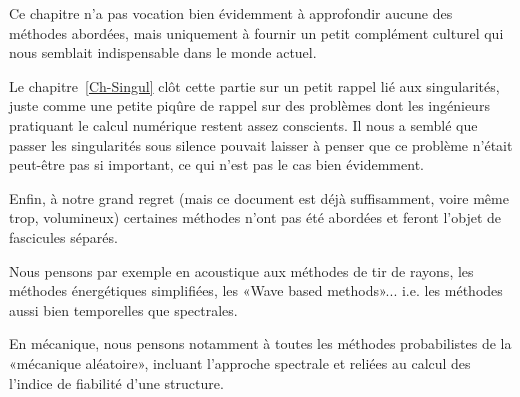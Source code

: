 Ce chapitre n'a pas vocation bien évidemment à approfondir aucune des méthodes
abordées, mais uniquement à fournir un petit complément culturel qui nous semblait
indispensable dans le monde actuel.

\medskip
Le chapitre~\ref{Ch-Singul} clôt cette partie sur un petit rappel lié aux singularités,
juste comme une petite piqûre de rappel sur des problèmes dont les ingénieurs pratiquant
le calcul numérique restent assez conscients. Il nous a semblé que passer les singularités
sous silence pouvait laisser à penser que ce problème n'était peut-être pas si
important, ce qui n'est pas le cas bien évidemment.


\medskip
Enfin, à notre grand regret (mais ce document est déjà suffisamment, voire même trop,
volumineux) certaines méthodes n'ont pas été abordées et feront l'objet de fascicules
séparés.

Nous pensons par exemple en acoustique aux méthodes de tir de rayons, les méthodes
énergétiques simplifiées, les «Wave based methods»... i.e. les méthodes aussi bien
temporelles que spectrales.

En mécanique, nous pensons notamment à toutes les méthodes probabilistes de la
«mécanique aléatoire», incluant l'approche spectrale et reliées au calcul des
l'indice de fiabilité d'une structure.


